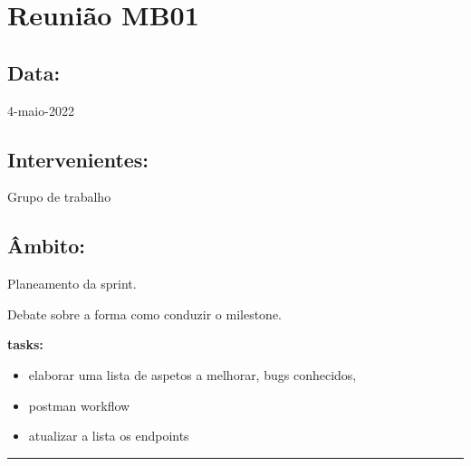 \section{Reunião MB01}\label{reuniaoMB01}

\subsection*{Data:}
4-maio-2022

\subsection*{Intervenientes:}
Grupo de trabalho 

\subsection*{Âmbito:}
Planeamento da sprint.

Debate sobre a forma como conduzir o milestone. 

\textbf{tasks:}

\begin{itemize}
	\item elaborar uma lista de aspetos a melhorar, bugs conhecidos,
	\item postman workflow
	\item atualizar a lista os endpoints
\end{itemize}

\noindent \rule{\linewidth}{0.4pt}
\newline

